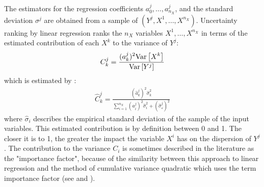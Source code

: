 {  The estimators   for the regression coefficients $a_0^j,\ldots,a_{n_X}^j$, and the standard deviation $\sigma^j$ are obtained from a sample of $(Y^j,X^1,\ldots,X^{n_X})$. Uncertainty ranking by linear regression ranks the $n_X$ variables $X^1,\ldots, X^{n_X}$ in terms of the estimated contribution of each $X^k$ to the variance of $Y^j$:
  \begin{align*}
    C^j_k = \frac{\displaystyle (a_k^j)^2  {\rm Var}\left[ X^k \right]}{ {\rm Var}\left[ Y^j \right]}
  \end{align*}
  which is estimated by :
  \begin{align*}
    \widehat{C}^j_k = \frac{\displaystyle (\widehat{a}_k^j)^2 \widehat{\sigma}_k^2}{\displaystyle \sum_{i=1}^{n_X} (a_i^j)^2 \widehat{\sigma}_i^2 + (\widehat{\sigma}_{\varepsilon}^j)^2}
  \end{align*}
  where $\widehat{\sigma}_i$ describes the empirical standard deviation of the sample of the input variables. This estimated contribution is by definition between 0 and 1. The closer it is to 1, the greater the impact the variable $X^i$ has on the dispersion of $Y^j$.
}
{
  The contribution to the variance $C_i$ is sometimes described in the literature as the "importance factor", because of the similarity between this approach to linear regression and the method of cumulative variance quadratic which uses the term importance factor (see  and ).
}

